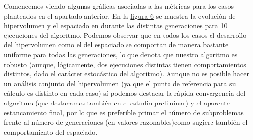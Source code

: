Comencemos viendo algunas gráficas asociadas a las métricas para los casos planteados en el apartado anterior. En la \hyperref[fig:6]{figura 6} se muestra la evolución de hipervolumen y el espaciado en durante las distintas generaciones para 10 ejecuciones del algoritmo. Podemos observar que en todos los casos  el desarrollo del hipervolumen como el del espaciado se comportan de manera bastante uniforme para todas las generaciones, lo que denota que nuestro algoritmo es robusto (aunque, lógicamente, dos ejecuciones distintas tienen comportamientos distintos, dado el carácter estocástico del algoritmo). Aunque no es posible hacer un análisis conjunto del hipervolumen (ya que el punto de referencia para su cálculo es distinto en cada caso) sí podemos destacar la rápida convergencia del algoritmo (que destacamos también en el estudio preliminar) y el aparente estancamiento final, por lo que es preferible primar el número de subproblemas frente al número de generaciones (en valores razonables)como sugiere también el comportamiento del espaciado.\\


